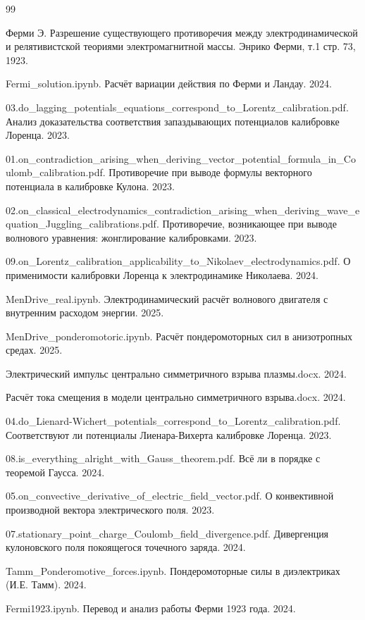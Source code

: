 \documentclass[12pt, a4paper]{article}
\begin{document}
\begin{thebibliography}{99}

Ферми Э. Разрешение существующего противоречия между электродинамической и релятивистской теориями электромагнитной массы. Энрико Ферми, т.1 стр. 73, 1923.

Fermi\_solution.ipynb. Расчёт вариации действия по Ферми и Ландау. 2024.

03.do\_lagging\_potentials\_equations\_correspond\_to\_Lorentz\_calibration.pdf. Анализ доказательства соответствия запаздывающих потенциалов калибровке Лоренца. 2023.

01.on\_contradiction\_arising\_when\_deriving\_vector\_potential\_formula\_in\_Coulomb\_calibration.pdf. Противоречие при выводе формулы векторного потенциала в калибровке Кулона. 2023.

02.on\_classical\_electrodynamics\_contradiction\_arising\_when\_deriving\_wave\_equation\_Juggling\_calibrations.pdf. Противоречие, возникающее при выводе волнового уравнения: жонглирование калибровками. 2023.

09.on\_Lorentz\_calibration\_applicability\_to\_Nikolaev\_electrodynamics.pdf. О применимости калибровки Лоренца к электродинамике Николаева. 2024.

MenDrive\_real.ipynb. Электродинамический расчёт волнового двигателя с внутренним расходом энергии. 2025.

MenDrive\_ponderomotoric.ipynb. Расчёт пондеромоторных сил в анизотропных средах. 2025.

Электрический импульс центрально симметричного взрыва плазмы.docx. 2024.

Расчёт тока смещения в модели центрально симметричного взрыва.docx. 2024.

04.do\_Lienard-Wichert\_potentials\_correspond\_to\_Lorentz\_calibration.pdf. Соответствуют ли потенциалы Лиенара-Вихерта калибровке Лоренца. 2023.

08.is\_everything\_alright\_with\_Gauss\_theorem.pdf. Всё ли в порядке с теоремой Гаусса. 2024.

05.on\_convective\_derivative\_of\_electric\_field\_vector.pdf. О конвективной производной вектора электрического поля. 2023.

07.stationary\_point\_charge\_Coulomb\_field\_divergence.pdf. Дивергенция кулоновского поля покоящегося точечного заряда. 2024.

Tamm\_Ponderomotive\_forces.ipynb. Пондеромоторные силы в диэлектриках (И.Е. Тамм). 2024.

Fermi1923.ipynb. Перевод и анализ работы Ферми 1923 года. 2024.

\end{thebibliography}
\end{document}

